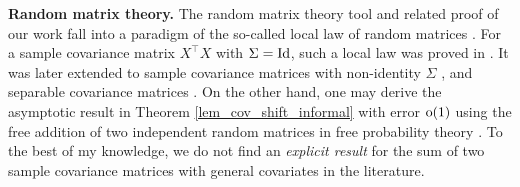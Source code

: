 \medskip
\noindent\textbf{Random matrix theory.}
The random matrix theory tool and related proof of our work fall into a paradigm of the so-called local law of random matrices \cite{erdos2017dynamical}.
For a sample covariance matrix $X^\top X$ with $\Sigma=\operatorname{Id}$, such a local law was proved in \cite{isotropic}.
It was later extended to sample covariance matrices with non-identity $\Sigma$ \cite{Anisotropic}, and separable covariance matrices \cite{yang2019spiked}. On the other hand, one may derive the asymptotic result in Theorem \ref{lem_cov_shift_informal} with error $\operatorname{o}(1)$ using the free addition of two independent random matrices in free probability theory \cite{nica2006lectures}. To the best of my knowledge, we do not find an {\it explicit result} for the sum of two sample covariance matrices with general covariates in the literature.


